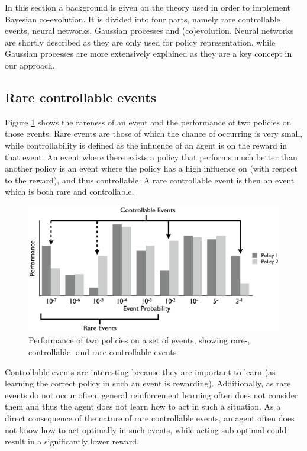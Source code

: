 In this section a background is given on the theory used in order to implement Bayesian co-evolution. It is divided into four parts, namely rare controllable events, neural networks, Gaussian processes and (co)evolution. Neural networks are shortly described as they are only used for policy representation, while Gaussian processes are more extensively explained as they are a key concept in our approach.

\subsection{Rare controllable events}
Figure \ref{rareControllableImage} shows the rareness of an event and the performance of two policies on those events. Rare events are those of which the chance of occurring is very small, while controllability is defined as the influence of an agent is on the reward in that event. An event where there exists a policy that performs much better than another policy is an event where the policy has a high influence on (with respect to the reward), and thus controllable. A rare controllable event is then an event which is both rare and controllable.

\begin{figure}[ht]
  \centering
  \includegraphics{images/rare-controllable.png}
  \caption{Performance of two policies on a set of events, showing rare-, controllable- and rare controllable events}\label{rareControllableImage}
\end{figure}

Controllable events are interesting because they are important to learn (as learning the correct policy in such an event is rewarding). Additionally, as rare events do not occur often, general reinforcement learning often does not consider them and thus the agent does not learn how to act in such a situation. As a direct consequence of the nature of rare controllable events, an agent often does not know how to act optimally in such events, while acting sub-optimal could result in a significantly lower reward.


